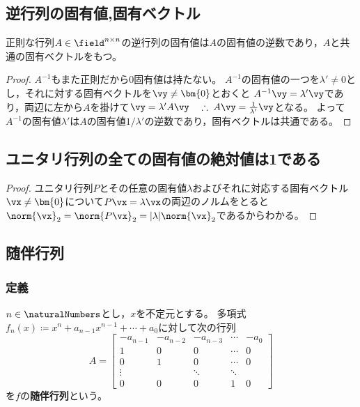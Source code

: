         \subsection{逆行列の固有値,固有ベクトル}
            \begin{shadebox}
                正則な行列$A\in\field^{n\times n}$の逆行列の固有値は$A$の固有値の逆数であり，$A$と共通の固有ベクトルをもつ。
            \end{shadebox}
            \begin{proof}
                $A^{-1}$もまた正則だから0固有値は持たない。
                $A^{-1}$の固有値の一つを$\lambda'\neq0$とし，それに対する固有ベクトルを$\vy\neq\bm{0}$とおくと
                $A^{-1}\vy = \lambda'\vy$であり，両辺に左から$A$を掛けて$\vy = \lambda'A\vy\quad\therefore\;A\vy = \frac{1}{\lambda'}\vy$となる。
                よって$A^{-1}$の固有値$\lambda'$は$A$の固有値$1/\lambda'$の逆数であり，固有ベクトルは共通である。
            \end{proof}
        \subsection{ユニタリ行列の全ての固有値の絶対値は1である}
            \begin{proof}
                ユニタリ行列$P$とその任意の固有値$\lambda$およびそれに対応する固有ベクトル$\vx \neq \bm{0}$について$P\vx = \lambda\vx$の両辺のノルムをとると$\norm{\vx}_2 = \norm{P\vx}_2 = |\lambda|\norm{\vx}_2$であるからわかる。
            \end{proof}
        \subsection{随伴行列}
            \subsubsection{定義}
                \label{随伴行列の定義}
                $n\in\naturalNumbers$とし，$x$を不定元とする。
                多項式$f_n(x)\coloneq x^n+a_{n-1}x^{n-1}+\dotsb+a_0$に対して次の行列
                \[
                    A =
                    \begin{bmatrix}
                        -a_{n-1} & -a_{n-2} & -a_{n-3} & \cdots & -a_0 \\
                        1 & 0 & 0 & \cdots & 0 \\
                        0 & 1 & 0 & \cdots & 0 \\
                        \vdots & & \ddots & \ddots \\
                        0 & 0 & 0 & 1 & 0
                    \end{bmatrix}
                \]
                を$f$の\textbf{随伴行列}という。

